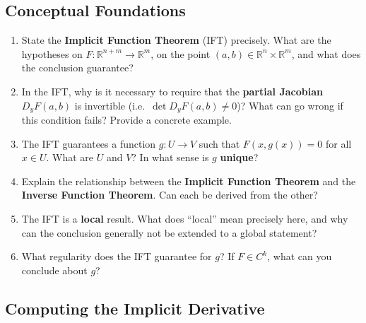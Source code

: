 \subsection{Conceptual Foundations}

\begin{enumerate}[leftmargin=*, label=\textbf{Q\arabic*.}]

\item State the \textbf{Implicit Function Theorem} (IFT) precisely. What are the hypotheses on $F : \mathbb{R}^{n+m} \to \mathbb{R}^m$, on the point $(a, b) \in \mathbb{R}^n \times \mathbb{R}^m$, and what does the conclusion guarantee?

\item In the IFT, why is it necessary to require that the \textbf{partial Jacobian} $D_y F(a,b)$ is invertible (i.e.\ $\det D_y F(a,b) \neq 0$)? What can go wrong if this condition fails? Provide a concrete example.

\item The IFT guarantees a function $g : U \to V$ such that $F(x, g(x)) = 0$ for all $x \in U$. What are $U$ and $V$? In what sense is $g$ \textbf{unique}?

\item Explain the relationship between the \textbf{Implicit Function Theorem} and the \textbf{Inverse Function Theorem}. Can each be derived from the other?

\item The IFT is a \textbf{local} result. What does ``local'' mean precisely here, and why can the conclusion generally not be extended to a global statement?

\item What regularity does the IFT guarantee for $g$? If $F \in C^k$, what can you conclude about $g$?

\end{enumerate}

\subsection{Computing the Implicit Derivative}

